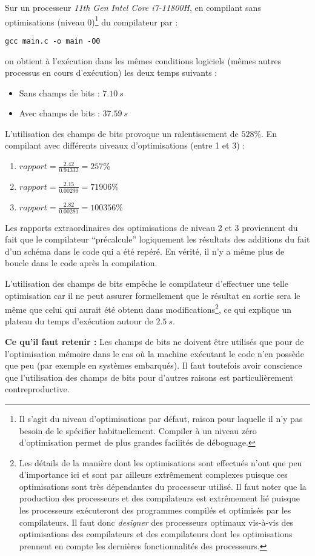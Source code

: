 \documentclass[../../../main.tex]{subfiles}
\begin{document}
Sur un processeur \textit{11th Gen Intel Core i7-11800H}, en compilant sans optimisations (niveau 0)\footnote{Il s'agit du niveau d'optimisations par défaut, raison pour laquelle il n'y pas besoin de le spécifier habituellement. Compiler à un niveau zéro d'optimisation permet de plus grandes facilités de déboguage.} du compilateur par :
\begin{verbatim}
gcc main.c -o main -O0
\end{verbatim}
on obtient à l'exécution dans les mêmes conditions logiciels (mêmes autres processus en cours d'exécution) les deux temps suivants :
\begin{itemize}
	\item Sans champs de bits : $7.10\ s$
	\item Avec champs de bits : $37.59\ s$
\end{itemize}
L'utilisation des champs de bits provoque un ralentissement de $528 \%$.
En compilant avec différents niveaux d'optimisations (entre 1 et 3) :
\begin{enumerate}
	\item $rapport = \frac{2.42}{0.94332} = 257\%$
	\item $rapport = \frac{2.15}{0.00299} = 71906\%$
	\item $rapport = \frac{2.82}{0.00281} = 100356\%$
\end{enumerate}
Les rapports extraordinaires des optimisations de niveau 2 et 3 proviennent du fait que le compilateur ``précalcule'' logiquement les résultats des additions du fait d'un schéma dans le code qui a été repéré. En vérité, il n'y a même plus de boucle dans le code après la compilation.

L'utilisation des champs de bits empêche le compilateur d'effectuer une telle optimisation car il ne peut assurer formellement que le résultat en sortie sera le même que celui qui aurait été obtenu dans modifications\footnote{Les détails de la manière dont les optimisations sont effectués n'ont que peu d'importance ici et sont par ailleurs extrêmement complexes puisque ces optimisations sont très dépendantes du processeur utilisé. Il faut noter que la production des processeurs et des compilateurs est extrêmement lié puisque les processeurs exécuteront des programmes compilés et optimisés par les compilateurs. Il faut donc \textit{designer} des processeurs optimaux vis-à-vis des optimisations des compilateurs et des compilateurs dont les optimisations prennent en compte les dernières fonctionnalités des processeurs.}, ce qui explique un plateau du temps d'exécution autour de $2.5\ s$.

\textbf{Ce qu'il faut retenir :} Les champs de bits ne doivent être utilisés que pour de l'optimisation mémoire dans le cas où la machine exécutant le code n'en possède que peu (par exemple en systèmes embarqués). Il faut toutefois avoir conscience que l'utilisation des champs de bits pour d'autres raisons est particulièrement contreproductive.
\end{document}
